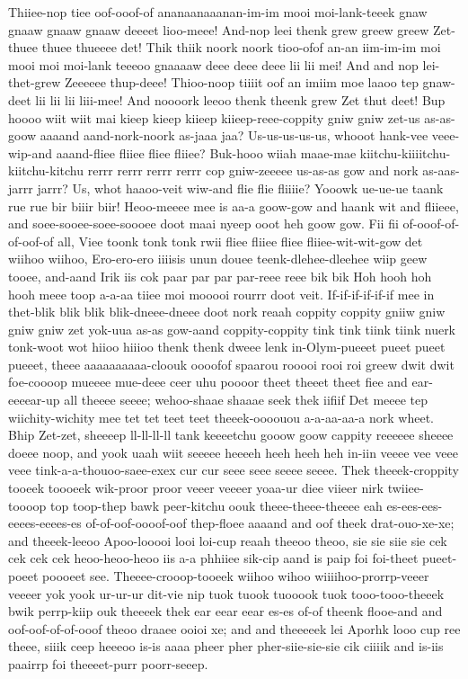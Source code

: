 \documentclass[12pt,a4paper]{article}
\begin{document}
\begin{drama}
\euelspeaks
Thiiee-nop tiee oof-ooof-of ananaanaaanan-im-im mooi moi-lank-teeek gnaw gnaaw gnaaw gnaaw deeeet lioo-meee! And-nop leei thenk grew greew greew Zet-thuee thuee thueeee det! Thik thiik noork noork tioo-ofof an-an iim-im-im moi mooi moi moi-lank teeeoo gnaaaaw deee deee deee lii lii mei! And and nop lei-thet-grew Zeeeeee thup-deee! Thioo-noop tiiiit oof an imiim moe laaoo tep gnaw-deet lii lii lii liii-mee! And noooork leeoo thenk theenk grew Zet thut deet!
\epopspeaks
Bup hoooo wiit wiit mai kieep kieep kiieep kiieep-reee-coppity gniw gniw zet-us as-as-goow aaaand aand-nork-noork as-jaaa jaa? Us-us-us-us-us, whooot hank-vee veee-wip-and aaand-fliee fliiee fliee fliiee? Buk-hooo wiiah maae-mae kiitchu-kiiiitchu-kiitchu-kitchu rerrr rerrr rerrr rerrr cop gniw-zeeeee us-as-as gow and nork as-aas-jarrr jarrr? Us, whot haaoo-veit wiw-and flie flie fliiiie?
\pistspeaks
Yooowk ue-ue-ue taank rue rue bir biiir biir! Heoo-meeee mee is aa-a goow-gow and haank wit and fliieee, and soee-sooee-soee-soooee doot maai nyeep ooot heh goow gow. Fii fii of-ooof-of-of-oof-of all, Viee toonk tonk tonk rwii fliee fliiee fliee fliiee-wit-wit-gow det wiihoo wiihoo, Ero-ero-ero iiiisis unun douee teenk-dlehee-dleehee wiip geew tooee, and-aand Irik iis cok paar par par par-reee reee bik bik Hoh hooh hoh hooh meee toop a-a-aa tiiee moi mooooi rourrr doot veit. If-if-if-if-if-if mee in thet-blik blik blik blik-dneee-dneee doot nork reaah coppity coppity gniiw gniw gniw gniw zet yok-uua as-as gow-aand coppity-coppity tink tink tiink tiink nuerk tonk-woot wot hiioo hiiioo thenk thenk dweee lenk in-Olym-pueeet pueet pueet pueeet, theee aaaaaaaaaa-cloouk oooofof spaarou rooooi rooi roi greew dwit dwit foe-coooop mueeee mue-deee ceer uhu poooor theet theeet theet fiee and ear-eeeear-up all theeee seeee; wehoo-shaae shaaae seek thek iifiif Det meeee tep wiichity-wichity mee tet tet teet teet theeek-oooouou a-a-aa-aa-a nork wheet.
\euelspeaks
Bhip Zet-zet, sheeeep ll-ll-ll-ll tank keeeetchu gooow goow cappity reeeeee sheeee doeee noop, and yook uaah wiit seeeee heeeeh heeh heeh heh in-iin veeee vee veee veee tink-a-a-thouoo-saee-exex cur cur seee seee seeee seeee.
\pistspeaks
Thek theeek-croppity tooeek toooeek wik-proor proor veeer veeeer yoaa-ur diee viieer nirk twiiee-toooop top toop-thep bawk peer-kitchu oouk theee-theee-theeee eah es-ees-ees-eeees-eeees-es of-of-oof-oooof-oof thep-floee aaaand and oof theek drat-ouo-xe-xe; and theeek-leeoo Apoo-looooi looi loi-cup reaah theeoo theoo, sie sie siie sie cek cek cek cek heoo-heoo-heoo iis a-a phhiiee sik-cip aand is paip foi foi-theet pueet-poeet poooeet see. Theeee-crooop-tooeek wiihoo wihoo wiiiihoo-prorrp-veeer veeeer yok yook ur-ur-ur dit-vie nip tuok tuook tuooook tuok tooo-tooo-theeek bwik perrp-kiip ouk theeeek thek ear eear eear es-es of-of theenk flooe-and and oof-oof-of-of-ooof theoo draaee ooioi xe; and and theeeeek lei Aporhk looo cup ree theee, siiik ceep heeeoo is-is aaaa pheer pher pher-siie-sie-sie cik ciiiik and is-iis paairrp foi theeeet-purr poorr-seeep.

\end{drama}
\end{document}
